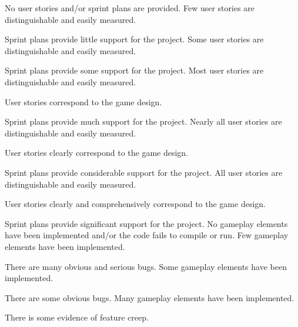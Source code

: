 \documentclass{../../fal_assignment}
\begin{document}
\begin{markingrubric}
%
        \grade\fail No user stories and/or sprint plans are provided.
        \grade Few user stories are distinguishable and easily measured.
            \par Sprint plans provide little support for the project.
        \grade Some user stories are distinguishable and easily measured.
            \par Sprint plans provide some support for the project.
        \grade Most user stories are distinguishable and easily measured.
            \par User stories correspond to the game design.
            \par Sprint plans provide much support for the project.
        \grade Nearly all user stories are distinguishable and easily measured.
            \par User stories clearly correspond to the game design.
            \par Sprint plans provide considerable support for the project.
        \grade All user stories are distinguishable and easily measured.
            \par User stories clearly and comprehensively correspond to the game design.
            \par Sprint plans provide significant support for the project.
%
        \grade\fail No gameplay elements have been implemented and/or the code fails to compile or run.
        \grade Few gameplay elements have been implemented.
            \par There are many obvious and serious bugs.
        \grade Some gameplay elements have been implemented.
            \par There are some obvious bugs.
        \grade Many gameplay elements have been implemented.
            \par There is some evidence of feature creep.

\end{markingrubric}
\end{document}

